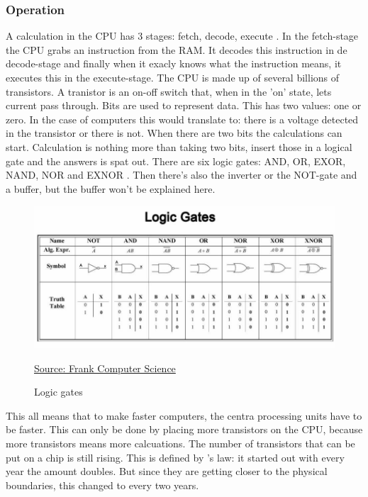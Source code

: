 \subsubsection{Operation} \label{working}
A calculation in the CPU has 3 stages: fetch, decode, execute \autocite{cpu}.
In the fetch-stage the CPU grabs an instruction from the RAM. It decodes this instruction in de decode-stage and finally when it exacly knows what the instruction means, it executes this in the execute-stage.
The CPU is made up of several billions of transistors. A tranistor is an on-off switch that, when in the 'on' state, lets current pass through.
Bits are used to represent data. This has two values: one or zero\autocite{bit}. In the case of computers this would translate to: there is a voltage detected in the transistor or there is not.
When there are two bits the calculations can start. Calculation is nothing more than taking two bits, insert those in a logical gate and the answers is spat out.
There are six logic gates: AND, OR, EXOR, NAND, NOR and EXNOR \autocite{gates}. Then there's also the inverter or the NOT-gate and a buffer, but the buffer won't be explained here.

\begin{figure} [h]
    \centering
    \includegraphics[width=\textwidth]{img/gates.jpg}
        \caption{Logic gates}
        \label{fig:logicGates}
        \href{https://frankcomputerscience.wordpress.com/chapter-3/}{Source: Frank Computer Science}
\end{figure}

This all means that to make faster computers, the centra processing units have to be faster. This can only be done by placing more transistors on the CPU, because more transistors means more calcuations.
The number of transistors that can be put on a chip is still rising. This is defined by \textcite{Moore1965}'s law: it started out with every year the amount doubles. But since they are getting closer to the physical boundaries, this changed to every two years.


